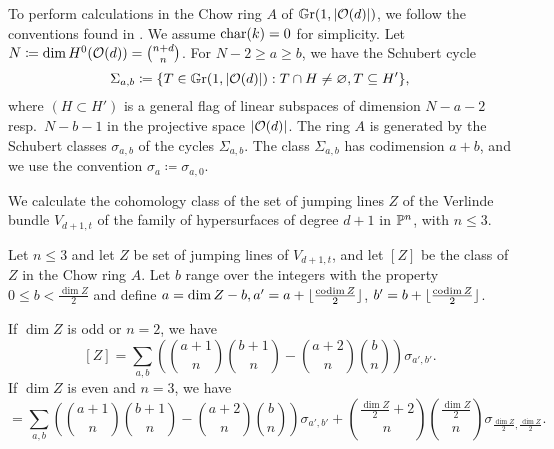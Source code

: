To perform calculations in the Chow ring $A$ of $\mathbb G \mathrm r(1,\lvert\mathcal{O}(d)\rvert)$, we follow the conventions found in \cite{eisenbud-harris-intersection-theory}. We assume $\operatorname{char}(k) = 0$ for simplicity. Let $N\coloneqq \dim H^0(\mathcal{O}(d)) = \binom{n+d}{n}$. For $N-2\geq a\geq b$, we have the Schubert cycle 
\[
	\Sigma_{a,b}\coloneqq \{T \in \mathbb G \mathrm r(1,\lvert\mathcal{O}(d)\rvert) : T \cap H \neq \varnothing, T \subseteq H'\},
\]
where $(H\subset H')$ is a general flag of linear subspaces of dimension $N-a-2$ resp.\ $N-b-1$ in the projective space $\lvert\mathcal{O}(d)\rvert$.
The ring $A$ is generated by the Schubert classes $\sigma_{a,b}$ of the cycles $\Sigma_{a,b}$.
The class $\Sigma_{a,b}$ has codimension $a+b$, and we use the convention $\sigma_{a}\coloneqq \sigma_{a,0}$.

We calculate the cohomology class of the set of jumping lines $Z$ of the Verlinde bundle $V_{d+1,t}$ of the family of hypersurfaces of degree $d+1$ in $\mathbb{P}^n$, with $n\leq 3$.


\begin{proposition}
	Let $n \leq 3$ and let $Z$ be set of jumping lines of $V_{d+1,t}$, and let $[Z]$ be the class of $Z$ in the Chow ring $A$. Let $b$ range over the integers with the property $0\leq b < \frac{\dim Z}{2}$ and define $a=\dim Z - b, a'=a+\lfloor\frac{\operatorname{codim} Z}{2}\rfloor$, $b'=b+\lfloor\frac{\operatorname{codim} Z}{2}\rfloor$.
	\begin{enumerate}
		\huyitem If $\dim Z$ is odd or $n=2$, we have
		\begin{equation} \label{class-of-locus}
			[Z] = \sum_{a,b} \left({\binom{a+1}{n}}{\binom{b+1}{n}}-{\binom{a+2}{n}}{\binom{b}{n}}\right) \sigma_{a',b'}. 
		\end{equation}
		\huyitem If $\dim Z$ is even and $n=3$, we have
		\begin{equation*}
			[Z] = \sum_{a,b} \left({\binom{a+1}{n}}{\binom{b+1}{n}}-{\binom{a+2}{n}}{\binom{b}{n}}\right) \sigma_{a',b'}
			+
			\binom{\frac{\dim Z}{2} + 2}{n}\binom{\frac{\dim Z}{2}}{n}\sigma_{\frac{\dim Z}{2},\frac{\dim Z}{2}}.
		\end{equation*}
	\end{enumerate}
\end{proposition}

